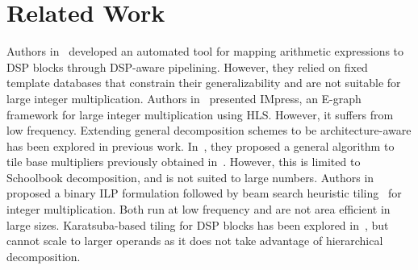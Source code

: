 \documentclass[sigconf,9pt,review]{acmart}
\begin{document}
\section{Related Work}
Authors in~\cite{fahmyMapDSPMaxPerformance2016} developed an automated tool for mapping arithmetic expressions to DSP blocks through DSP-aware pipelining.
However, they relied on fixed template databases that constrain their generalizability and are not suitable for large integer multiplication. 
Authors in~\cite{zhangIMpressLargeInteger2022} presented IMpress, an E-graph framework for large integer multiplication using HLS.
However, it suffers from low frequency.
Extending general decomposition schemes to be architecture-aware has been explored in previous work. 
In~\cite{royTileMultiplicationEfficient2014}, they proposed a general algorithm to tile base multipliers previously obtained in~\cite{pascaLargeMultipliersLessDSP2009}.
However, this is limited to Schoolbook decomposition, and is not suited to large numbers.
Authors in~\cite{kummTilingILP2017} proposed a binary ILP formulation followed by beam search heuristic tiling~\cite{kummTilingHeuristics2020} for integer multiplication.
Both run at low frequency and are not area efficient in large sizes.
Karatsuba-based tiling for DSP blocks has been explored in~\cite{kummKaratsubaRectangularMultipliers2018}, but cannot scale to larger operands as it does not take advantage of hierarchical decomposition.









% 


\end{document}
